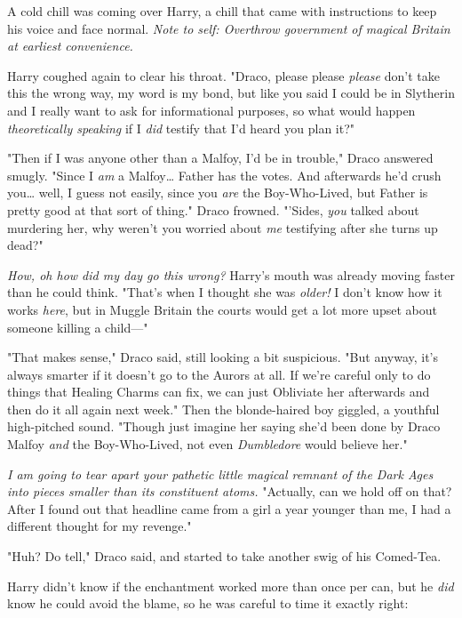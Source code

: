 A cold chill was coming over Harry, a chill that came with instructions to keep 
his voice and face normal. \emph{Note to self: Overthrow government of magical 
Britain at earliest convenience.}

Harry coughed again to clear his throat. "Draco, please please \emph{please} 
don't take this the wrong way, my word is my bond, but like you said I could be 
in Slytherin and I really want to ask for informational purposes, so what would 
happen \emph{theoretically speaking} if I \emph{did} testify that I'd heard you 
plan it?"

"Then if I was anyone other than a Malfoy, I'd be in trouble," Draco answered 
smugly. "Since I \emph{am} a Malfoy{\ldots} Father has the votes. And 
afterwards he'd crush you{\ldots} well, I guess not easily, since you 
\emph{are} the Boy-Who-Lived, but Father is pretty good at that sort of thing." 
Draco frowned. "'Sides, \emph{you} talked about murdering her, why weren't you 
worried about \emph{me} testifying after she turns up dead?"

\emph{How, oh how did my day go this wrong?} Harry's mouth was already moving 
faster than he could think. "That's when I thought she was\emph{ older!} I 
don't know how it works \emph{here}, but in Muggle Britain the courts would get 
a lot more upset about someone killing a child---"

"That makes sense," Draco said, still looking a bit suspicious. "But anyway, 
it's always smarter if it doesn't go to the Aurors at all. If we're careful 
only to do things that Healing Charms can fix, we can just Obliviate her 
afterwards and then do it all again next week." Then the blonde-haired boy 
giggled, a youthful high-pitched sound. "Though just imagine her saying she'd 
been done by Draco Malfoy \emph{and} the Boy-Who-Lived, not even 
\emph{Dumbledore} would believe her."

\emph{I am going to tear apart your pathetic little magical remnant of the Dark 
Ages into pieces smaller than its constituent atoms.} "Actually, can we hold 
off on that? After I found out that headline came from a girl a year younger 
than me, I had a different thought for my revenge."

"Huh? Do tell," Draco said, and started to take another swig of his Comed-Tea.

Harry didn't know if the enchantment worked more than once per can, but he 
\emph{did} know he could avoid the blame, so he was careful to time it exactly 
right:

